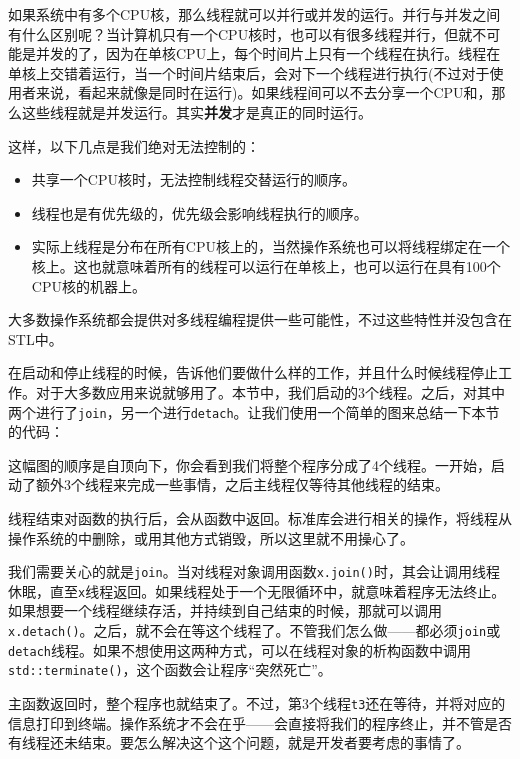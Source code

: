 如果系统中有多个CPU核，那么线程就可以并行或并发的运行。并行与并发之间有什么区别呢？当计算机只有一个CPU核时，也可以有很多线程并行，但就不可能是并发的了，因为在单核CPU上，每个时间片上只有一个线程在执行。线程在单核上交错着运行，当一个时间片结束后，会对下一个线程进行执行(不过对于使用者来说，看起来就像是同时在运行)。如果线程间可以不去分享一个CPU和，那么这些线程就是并发运行。其实\textbf{并发}才是真正的同时运行。

这样，以下几点是我们绝对无法控制的：

\begin{itemize}
\item 共享一个CPU核时，无法控制线程交替运行的顺序。

\item 线程也是有优先级的，优先级会影响线程执行的顺序。

\item 实际上线程是分布在所有CPU核上的，当然操作系统也可以将线程绑定在一个核上。这也就意味着所有的线程可以运行在单核上，也可以运行在具有100个CPU核的机器上。

\end{itemize}

大多数操作系统都会提供对多线程编程提供一些可能性，不过这些特性并没包含在STL中。

在启动和停止线程的时候，告诉他们要做什么样的工作，并且什么时候线程停止工作。对于大多数应用来说就够用了。本节中，我们启动的3个线程。之后，对其中两个进行了\texttt{join}，另一个进行\texttt{detach}。让我们使用一个简单的图来总结一下本节的代码：


这幅图的顺序是自顶向下，你会看到我们将整个程序分成了4个线程。一开始，启动了额外3个线程来完成一些事情，之后主线程仅等待其他线程的结束。

线程结束对函数的执行后，会从函数中返回。标准库会进行相关的操作，将线程从操作系统的中删除，或用其他方式销毁，所以这里就不用操心了。

我们需要关心的就是\texttt{join}。当对线程对象调用函数\texttt{x.join()}时，其会让调用线程休眠，直至\texttt{x}线程返回。如果线程处于一个无限循环中，就意味着程序无法终止。如果想要一个线程继续存活，并持续到自己结束的时候，那就可以调用\texttt{x.detach()}。之后，就不会在等这个线程了。不管我们怎么做——都必须\texttt{join}或\texttt{detach}线程。如果不想使用这两种方式，可以在线程对象的析构函数中调用\texttt{std::terminate()}，这个函数会让程序“突然死亡”。

主函数返回时，整个程序也就结束了。不过，第3个线程\texttt{t3}还在等待，并将对应的信息打印到终端。操作系统才不会在乎——会直接将我们的程序终止，并不管是否有线程还未结束。要怎么解决这个这个问题，就是开发者要考虑的事情了。


